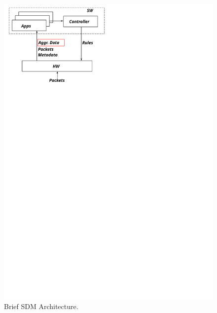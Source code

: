 \begin{figure}[b]
    \centering
    \includegraphics[scale=0.57]{chapters/pic/sdm_arch}
    \caption{Brief SDM Architecture.}
    \label{fig:sdmArch}
\end{figure}


